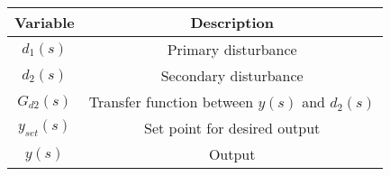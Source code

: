       \begin{tabular}{|c|c|} 
      \hline
\textbf{Variable}& \textbf{Description}\\\hline
         $d_1(s)$& Primary disturbance \\\hline
         $d_2(s)$& Secondary disturbance \\\hline
         $G_{d2}(s)$&Transfer function between $y(s)$ and $d_2(s)$\\\hline
         $y_{set}(s)$& Set point for desired output \\\hline
         $y(s)$ & Output \\\hline
        \end{tabular}
        
        
